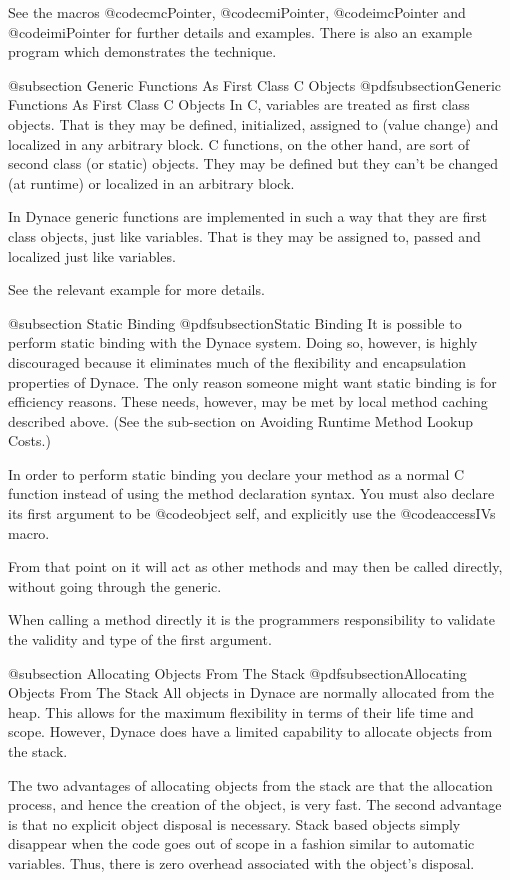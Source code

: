 See the macros @code{cmcPointer}, @code{cmiPointer}, @code{imcPointer} and
@code{imiPointer} for further details and examples.  There is also an
example program which demonstrates the technique.



@subsection Generic Functions As First Class C Objects
@pdfsubsection{Generic Functions As First Class C Objects}
In C, variables are treated as first class objects.  That is they may
be defined, initialized, assigned to (value change) and localized in
any arbitrary block.  C functions, on the other hand, are sort of
second class (or static) objects.  They may be defined but they
can't be changed (at runtime) or localized in an arbitrary block.

In Dynace generic functions are implemented in such a way that they
are first class objects, just like variables.  That is they may
be assigned to, passed and localized just like variables.

See the relevant example for more details.


@subsection Static Binding
@pdfsubsection{Static Binding}
It is possible to perform static binding with the Dynace system.  Doing so,
however, is highly discouraged because it eliminates much of the
flexibility and encapsulation properties of Dynace.  The only reason
someone might want static binding is for efficiency reasons.  These
needs, however, may be met by local method caching described above.
(See the sub-section on Avoiding Runtime Method Lookup Costs.)

In order to perform static binding you declare your method as a normal
C function instead of using the method declaration syntax.  You must
also declare its first argument to be @code{object self}, and explicitly use
the @code{accessIVs} macro.

From that point on it will act as other methods and may then be called
directly, without going through the generic.


When calling a method directly it is the programmers responsibility to
validate the validity and type of the first argument.


@subsection Allocating Objects From The Stack
@pdfsubsection{Allocating Objects From The Stack}
All objects in Dynace are normally allocated from the heap.  This
allows for the maximum flexibility in terms of their life time
and scope.  However, Dynace does have a limited capability to
allocate objects from the stack.

The two advantages of allocating objects from the stack are that
the allocation process, and hence the creation of the object, is very
fast.  The second advantage is that no explicit object disposal is
necessary. Stack based objects simply disappear when the code goes
out of scope in a fashion similar to automatic variables.  Thus,
there is zero overhead associated with the object's disposal.

